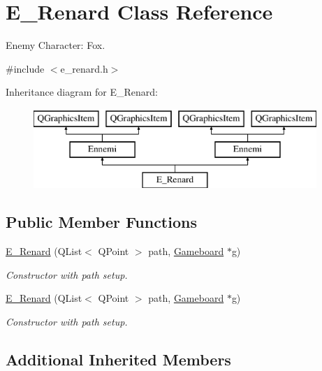 \hypertarget{class_e___renard}{}\section{E\+\_\+\+Renard Class Reference}
\label{class_e___renard}


Enemy Character\+: Fox.  




{\ttfamily \#include $<$e\+\_\+renard.\+h$>$}

Inheritance diagram for E\+\_\+\+Renard\+:\begin{figure}[H]
\begin{center}
\leavevmode
\includegraphics[height=3.000000cm]{class_e___renard}
\end{center}
\end{figure}
\subsection*{Public Member Functions}
\begin{DoxyCompactItemize}
\item 
\hyperlink{class_e___renard_aa5c7e87d02089ed76c306a3434133645}{E\+\_\+\+Renard} (Q\+List$<$ Q\+Point $>$ path, \hyperlink{class_gameboard}{Gameboard} $\ast$g)
\begin{DoxyCompactList}\small\item\em Constructor with path setup. \end{DoxyCompactList}\item 
\hyperlink{class_e___renard_aa5c7e87d02089ed76c306a3434133645}{E\+\_\+\+Renard} (Q\+List$<$ Q\+Point $>$ path, \hyperlink{class_gameboard}{Gameboard} $\ast$g)
\begin{DoxyCompactList}\small\item\em Constructor with path setup. \end{DoxyCompactList}\end{DoxyCompactItemize}
\subsection*{Additional Inherited Members}


